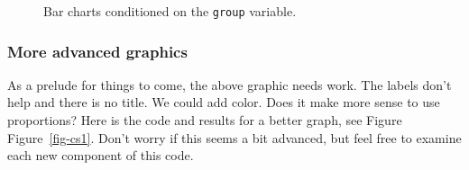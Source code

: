 \documentclass[
  letterpaper,
  DIV=11,
  numbers=noendperiod]{scrreprt}
\begin{document}
\begin{figure}[H]


\caption{\label{fig-split}Bar charts conditioned on the \texttt{group}
variable.}

\end{figure}%

\subsubsection{More advanced graphics}\label{more-advanced-graphics}

As a prelude for things to come, the above graphic needs work. The
labels don't help and there is no title. We could add color. Does it
make more sense to use proportions? Here is the code and results for a
better graph, see Figure Figure~\ref{fig-cs1}. Don't worry if this seems
a bit advanced, but feel free to examine each new component of this
code.
\end{document}
